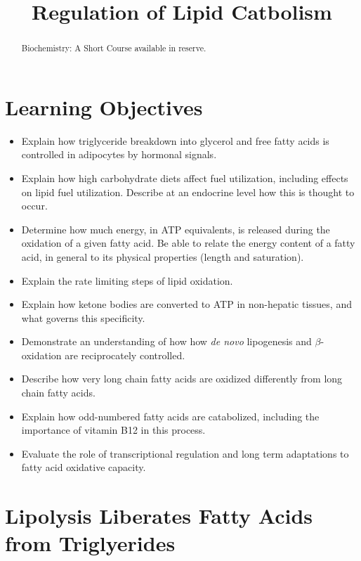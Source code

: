 \documentclass{tufte-handout}
\title{Regulation of Lipid Catbolism}
\author{}
\date{}  %
\begin{document}
\maketitle%

\begin{abstract}
\noindent  Biochemistry: A Short Course available in reserve\cite{Berg2015}.
\end{abstract}

\tableofcontents

\pagebreak
\section{Learning Objectives}

\begin{itemize}
\item Explain how triglyceride breakdown into glycerol and free fatty acids is controlled in adipocytes by hormonal signals.
\item Explain how high carbohydrate diets affect fuel utilization, including effects on lipid fuel utilization.  Describe at an endocrine level how this is thought to occur.
\item Determine how much energy, in ATP equivalents, is released during the oxidation of a given fatty acid.  Be able to relate the energy content of a fatty acid, in general to its physical properties (length and saturation).
\item Explain the rate limiting steps of lipid oxidation.
\item Explain how ketone bodies are converted to ATP in non-hepatic tissues, and what governs this specificity.
\item Demonstrate an understanding of how how \textit{de novo} lipogenesis and $\beta$-oxidation are reciprocately controlled.
\item Describe how very long chain fatty acids are oxidized differently from long chain fatty acids.
\item Explain how odd-numbered fatty acids are catabolized, including the importance of vitamin B12 in this process. 
\item Evaluate the role of transcriptional regulation and long term adaptations to fatty acid oxidative capacity.
\end{itemize}


\section{Lipolysis Liberates Fatty Acids from Triglyerides}
\end{document}
